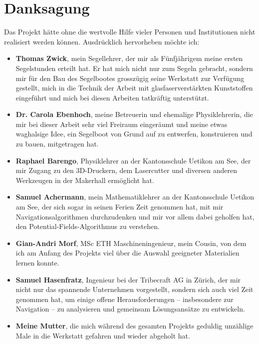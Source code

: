  \chapter{Danksagung}
\label{chap:danksagung}
Das Projekt hätte ohne die wertvolle Hilfe vieler Personen und Institutionen nicht realisiert werden können. Ausdrücklich hervorheben möchte ich:
\begin{itemize}
    \item \textbf{Thomas Zwick}, mein Segellehrer, der mir als Fünfjährigem meine ersten Segelstunden erteilt hat. Er hat mich nicht nur zum Segeln gebracht, sondern mir für den Bau des Segelbootes grosszügig seine Werkstatt zur Verfügung gestellt, mich in die Technik der Arbeit mit glasfaserverstärkten Kunststoffen eingeführt und mich bei diesen Arbeiten tatkräftig unterstützt.

    \item \textbf{Dr. Carola Ebenhoch}, meine Betreuerin und ehemalige Physiklehrerin, die mir bei dieser Arbeit sehr viel Freiraum eingeräumt und meine etwas waghalsige Idee, ein Segelboot von Grund auf zu entwerfen, konstruieren und zu bauen, mitgetragen hat.

    \item \textbf{Raphael Barengo}, Physiklehrer an der Kantonsschule Uetikon am See, der mir Zugang zu den 3D-Druckern, dem Lasercutter und diversen anderen Werkzeugen in der Makerhall ermöglicht hat.

    \item \textbf{Samuel Achermann}, mein Mathematiklehrer an der Kantonsschule Uetikon am See, der sich sogar in seinen Ferien Zeit genommen hat, mit mir Navigationsalgorithmen durchzudenken und mir vor allem dabei geholfen hat, den Potential-Fields-Algorithmus zu verstehen.

    \item \textbf{Gian-Andri Morf}, MSc ETH Maschineningenieur, mein Cousin, von dem ich am Anfang des Projekts viel über die Auswahl geeigneter Materialien lernen konnte.

    \item \textbf{Samuel Hasenfratz}, Ingenieur bei der Tribecraft AG in Zürich, der mir nicht nur das spannende Unternehmen vorgestellt, sondern sich auch viel Zeit genommen hat, um einige offene Herausforderungen – insbesondere zur Navigation – zu analysieren und gemeinsam Lösungsansätze zu entwickeln.

    \item \textbf{Meine Mutter}, die mich während des gesamten Projekts geduldig unzählige Male in die Werkstatt gefahren und wieder abgeholt hat.


\end{itemize}
